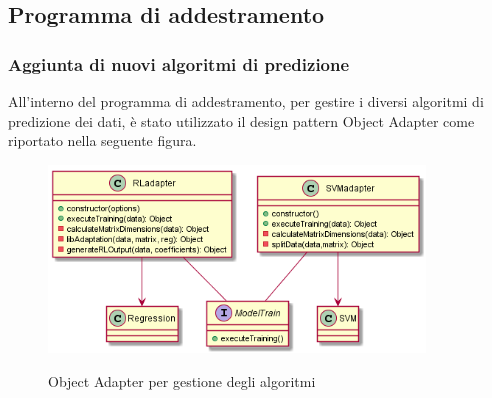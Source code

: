 \documentclass[../manuale-sviluppatore.tex]{subfiles}
\begin{document}
\subsection{Programma di addestramento}
\label{sub:programma_di_addestramento}

\subsubsection{Aggiunta di nuovi algoritmi di predizione}
\label{ssub:nuovi_algoritmi_di_predizione}
All'interno del programma di addestramento, per gestire i diversi algoritmi di predizione dei dati, è stato utilizzato il design pattern Object Adapter come riportato nella seguente figura.

\begin{figure}[H]
  \centering
  \includegraphics[width=10cm]{img/objectAdapter.png}
  \label{fig:scice_documenti}
  \caption{Object Adapter per gestione degli algoritmi}
\end{figure}
\end{document}
